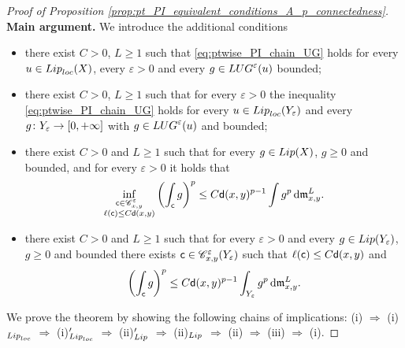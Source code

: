 \documentclass[12pt]{amsart}
\newcommand{\sfd}{{\sf d}}
\renewcommand{\d}{{\mathrm d}}
\newcommand{\X}{{\rm X}}
\newcommand{\Y}{{\rm Y}}
\newcommand{\Lip}{{\rm Lip}}
\newcommand{\loc}{{\rm loc}}
\newcommand{\mm}{\mathfrak m}
\theoremstyle{definition}
\newcommand{\sfc}{{\sf c}}
\newcommand{\Chain}[1]{\mathscr{C}^{#1}}
\newcommand{\LUG}[1]{{\rm LUG}^{#1}}
\begin{document}
\begin{proof}[Proof of Proposition \ref{prop:pt_PI_equivalent_conditions_A_p_connectedness}]
    \textbf{Main argument.} 
    We introduce the additional conditions
    \begin{itemize}
        \item[(i)$_{\Lip_\loc}$] there exist $C>0$, $L\ge 1$ such that \eqref{eq:ptwise_PI_chain_UG} holds for every $u\in \Lip_\loc(\X)$, every $\varepsilon > 0$ and every $g\in \LUG{\varepsilon}(u)$ bounded;
        \item[(i)$_{\Lip_\loc}'$] there exist $C>0$, $L\ge 1$ such that for every $\varepsilon > 0$ the inequality \eqref{eq:ptwise_PI_chain_UG} holds for every $u\in \Lip_\loc(\Y_\varepsilon)$ and every $g \colon \Y_\varepsilon \to [0,+\infty]$ with $g \in \LUG{\varepsilon}(u)$ and bounded;
        \item[(ii)$_{\Lip}$] there exist $C>0$ and $L\ge 1$ such that for every $g\in \Lip(\X)$, $g\ge 0$ and bounded, and for every $\varepsilon > 0$ it holds that
       \begin{equation}
        \label{eq:A_p-connectedness-limit_Lipschitz}
            \inf_{\substack{\sfc \in \Chain{\varepsilon}_{x,y}\\ \ell(\sfc) \le C\sfd(x,y)}} \left(\int_{\sfc} g\right)^p \le C\sfd(x,y)^{p-1}\int g^p\,\d\mm_{x,y}^L.
        \end{equation}
        \item[(ii)$'_{\Lip}$] there exist $C>0$ and $L\ge 1$ such that for every $\varepsilon > 0$ and every $g\in \Lip(\Y_\varepsilon)$, $g\ge 0$ and bounded there exists $\sfc \in \Chain{\varepsilon}_{x,y}(\Y_\varepsilon)$ such that $\ell(\sfc) \le C\sfd(x,y)$ and
       \begin{equation}
        \label{eq:A_p-connectedness-Y-varepsilon}
            \left(\int_{\sfc} g\right)^p \le C\sfd(x,y)^{p-1}\int_{\Y_\varepsilon} g^p\,\d\mm_{x,y}^L.
        \end{equation}
        
    \end{itemize}

    We prove the theorem by showing the following chains of implications: (i) $\Rightarrow$ (i)$_{\Lip_\loc}$ $\Rightarrow$ (i)$_{\Lip_\loc}'$ $\Rightarrow$ (ii)$_{\Lip}'$ $\Rightarrow$ (ii)$_\Lip$ $\Rightarrow$ (ii) $\Rightarrow$ (iii) $\Rightarrow$ (i).
    

\end{proof}
\end{document}
